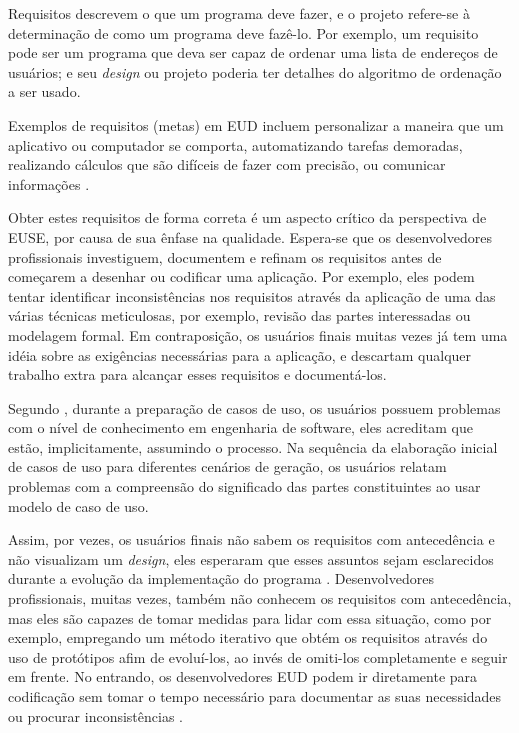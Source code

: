 Requisitos descrevem o que um programa deve fazer, e o projeto refere-se à determinação de como um programa deve fazê-lo. Por exemplo, um requisito pode ser um programa que deva ser capaz de ordenar uma lista de endereços de usuários; e seu \textit{design} ou projeto poderia ter detalhes do algoritmo de ordenação a ser usado.

Exemplos de requisitos (metas) em EUD incluem personalizar a maneira que um aplicativo ou computador se comporta, automatizando tarefas demoradas, realizando cálculos que são difíceis de fazer com precisão, ou comunicar informações \cite{ko2011state,blackwell2003notational,rosson2005minimalist}.

Obter estes requisitos de forma correta é um aspecto crítico da perspectiva de EUSE, por causa de sua ênfase na qualidade. Espera-se que os desenvolvedores profissionais investiguem, documentem e refinam os requisitos antes de começarem a desenhar ou codificar uma aplicação. Por exemplo, eles podem tentar identificar inconsistências nos requisitos através da aplicação de uma das várias técnicas meticulosas, por exemplo, revisão das partes interessadas ou modelagem formal. Em contraposição, os usuários finais muitas vezes já tem uma idéia sobre as exigências necessárias para a aplicação, e descartam qualquer trabalho extra para alcançar esses requisitos e documentá-los.

Segundo , durante a preparação de casos de uso, os usuários possuem problemas com o nível de conhecimento em engenharia de software, eles acreditam que estão, implicitamente, assumindo o processo. Na sequência da elaboração inicial de casos de uso para diferentes cenários de geração, os usuários relatam problemas com a compreensão do significado das partes constituintes ao usar modelo de caso de uso.

Assim, por vezes, os usuários finais não sabem os requisitos com antecedência e não visualizam um \textit{design}, eles esperaram que esses assuntos sejam esclarecidos durante a evolução da implementação do programa \cite{costabile2006supporting,fischer2006meta,morch2000tailoring}. Desenvolvedores profissionais, muitas vezes, também não conhecem os requisitos com antecedência, mas eles são capazes de tomar medidas para lidar com essa situação, como por exemplo, empregando um método iterativo que obtém os requisitos através do uso de protótipos afim de evoluí-los, ao invés de omiti-los completamente e seguir em frente. No entrando, os desenvolvedores EUD podem ir diretamente para codificação sem tomar o tempo necessário para documentar as suas necessidades ou procurar inconsistências \cite{rosson2013end}.

